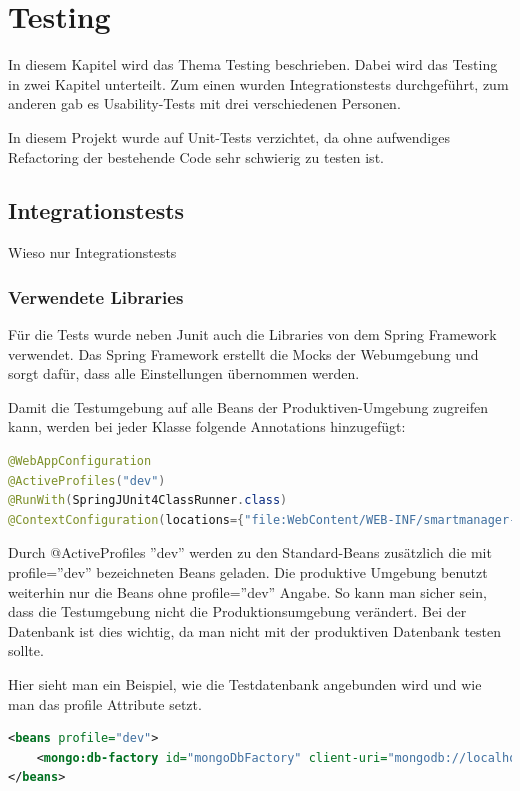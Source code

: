 \section{Testing}
In diesem Kapitel wird das Thema Testing beschrieben. Dabei wird das Testing in zwei Kapitel unterteilt. Zum einen wurden Integrationstests durchgeführt, zum anderen gab es Usability-Tests mit drei verschiedenen Personen.

In diesem Projekt wurde auf Unit-Tests verzichtet, da ohne aufwendiges Refactoring der bestehende Code sehr schwierig zu testen ist.
\subsection{Integrationstests}
Wieso nur Integrationstests

\subsubsection{Verwendete Libraries}
Für die Tests wurde neben Junit auch die Libraries von dem Spring Framework verwendet. Das Spring Framework erstellt die Mocks der Webumgebung und sorgt dafür, dass alle Einstellungen übernommen werden.

Damit die Testumgebung auf alle Beans der Produktiven-Umgebung zugreifen kann, werden bei jeder Klasse folgende Annotations hinzugefügt:
\begin{lstlisting}[language=java]
@WebAppConfiguration
@ActiveProfiles("dev")
@RunWith(SpringJUnit4ClassRunner.class)
@ContextConfiguration(locations={"file:WebContent/WEB-INF/smartmanager-servlet.xml"})
\end{lstlisting}

Durch @ActiveProfiles ''dev'' werden zu den Standard-Beans zusätzlich die mit profile=''dev'' bezeichneten Beans geladen. Die produktive Umgebung benutzt weiterhin nur die Beans ohne profile=''dev'' Angabe. So kann man sicher sein, dass die Testumgebung nicht die Produktionsumgebung verändert. Bei der Datenbank ist dies wichtig, da man nicht mit der produktiven Datenbank testen sollte.

Hier sieht man ein Beispiel, wie die Testdatenbank angebunden wird und wie man das profile Attribute setzt.
\begin{lstlisting}[language=xml]
<beans profile="dev">
	<mongo:db-factory id="mongoDbFactory" client-uri="mongodb://localhost/test" />
</beans>
\end{lstlisting}

